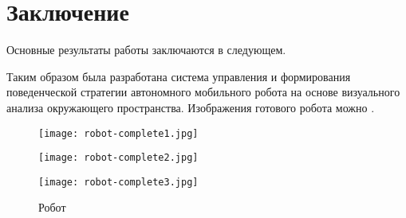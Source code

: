 \chapter*{Заключение}                       %


Основные результаты работы заключаются в следующем.

Таким образом была разработана система управления и формирования поведенческой стратегии автономного мобильного робота на основе визуального анализа окружающего пространства. Изображения готового робота можно .

\begin{figure}[ht]
  \begin{minipage}[b][][b]{0.32\linewidth}\centering
    \texttt{[image: robot-complete1.jpg]} \\
  \end{minipage}
  \hfill
  \begin{minipage}[b][][b]{0.32\linewidth}\centering
    \texttt{[image: robot-complete2.jpg]} \\
  \end{minipage}
  \hfill
  \begin{minipage}[b][][b]{0.32\linewidth}\centering
    \texttt{[image: robot-complete3.jpg]} \\
  \end{minipage}
  \caption{Робот }
  \label{fig:knuth}
\end{figure}